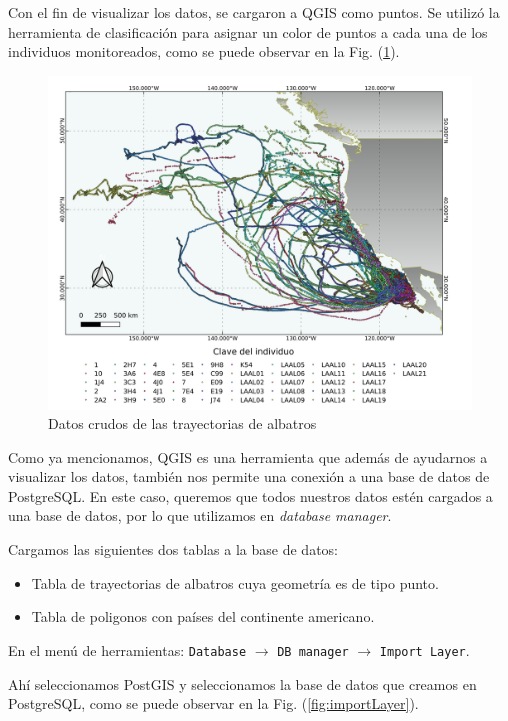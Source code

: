 Con el fin de visualizar los datos, se cargaron a QGIS como puntos. Se utilizó
la herramienta de clasificación para asignar un color de puntos a cada una de
los individuos monitoreados, como se puede observar en la Fig.
(\ref{fig:trayectorias}).

\begin{figure}[h]
    \centering
    \includegraphics[scale=0.60]{figures/RawData.png}
    \caption{Datos crudos de las trayectorias de albatros}
    \label{fig:trayectorias}
\end{figure}

Como ya mencionamos, QGIS es una herramienta que además de ayudarnos a
visualizar los datos, también nos permite una conexión a una base de datos de
PostgreSQL. En este caso, queremos que todos nuestros datos estén
cargados a una base de datos, por lo que utilizamos en \textit{database
manager}.

Cargamos las siguientes dos tablas a la base de datos:

\begin{itemize}
    \item Tabla de trayectorias de albatros cuya geometría es de tipo punto.
    \item Tabla de poligonos con países del continente americano.
\end{itemize}

En el menú de herramientas:
\texttt{Database} $\rightarrow$ \texttt{DB manager} $\rightarrow$ \texttt{Import
Layer}.

Ahí seleccionamos PostGIS y seleccionamos la base de datos que creamos en
PostgreSQL, como se puede observar en la Fig. (\ref{fig:importLayer}).

